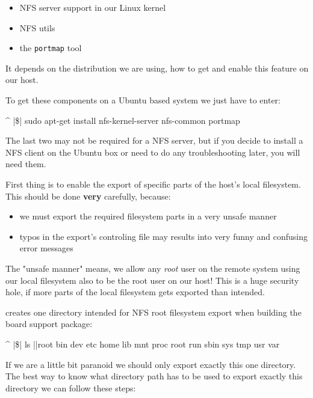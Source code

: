 \begin{itemize}
	\item NFS server support in our Linux kernel
	\item NFS utils
	\item the \texttt{portmap} tool
\end{itemize}

It depends on the distribution we are using, how to get and enable this feature on
our host.

To get these components on a Ubuntu based system we just have to enter:

\begin{ptxshell}[escapechar=|]{^}
|\$| sudo apt-get install nfs-kernel-server nfs-common portmap
\end{ptxshell}

The last two may not be required for a NFS server, but if you decide to install a
NFS client on the Ubuntu box or need to do any troubleshooting later, you will
need them.

First thing is to enable the export of specific parts of the host's local filesystem.
This should be done \textbf{very} carefully, because:

\begin{itemize}
	\item we must export the required filesystem parts in a very unsafe manner
	\item typos in the export's controling file may results into very funny and
		confusing error messages
\end{itemize}

The "unsafe manner" means, we allow any \textit{root} user on the remote system
using our local filesystem also to be the root user on our host! This is a huge
security hole, if more parts of the local filesystem gets exported than intended.

\ptxdist{} creates one directory intended for NFS root filesystem export when building
the board support package:

\begin{ptxshell}[escapechar=|]{^}
|\$|  ls |\ptxdistPlatformDir |root
bin  dev  etc  home  lib  mnt  proc  root  run  sbin  sys  tmp  usr  var
\end{ptxshell}

If we are a little bit paranoid we should only export exactly this one directory. The
best way to know what directory path has to be used to export exactly this directory
we can follow these steps:

